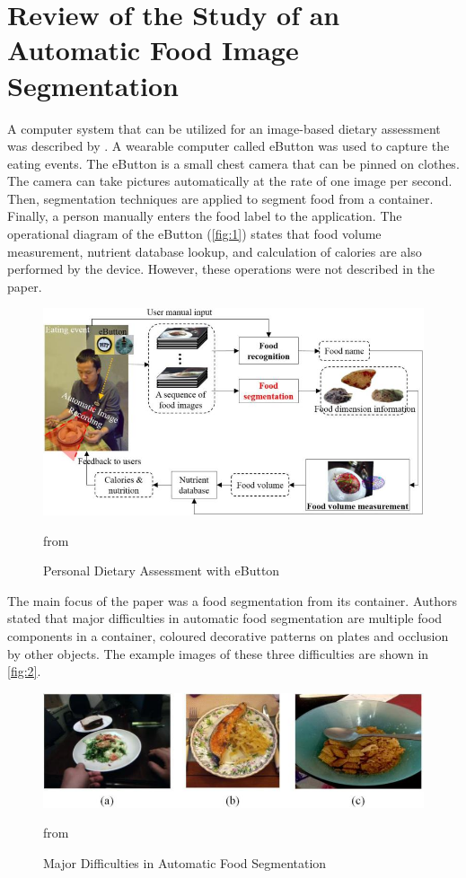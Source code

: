 \section{ Review of the  Study of an Automatic Food Image Segmentation }
A computer system that can be utilized for an image-based dietary assessment was described by \cite{chen2015saliency}. A wearable computer called eButton was used to capture the eating events. The eButton is a small chest camera that can be pinned on clothes. The camera can take pictures automatically at the rate of one image per second. Then, segmentation techniques are applied to segment food from a container. Finally, a person manually enters the food label to the application. The operational diagram of the eButton (\autoref{fig:1}) states that food volume measurement, nutrient database lookup, and calculation of calories are also performed by the device. However, these operations were not described in the paper. 

\begin{figure}[ht]
\centering
\includegraphics{Figures/segm_01.jpg}
\caption{Personal Dietary Assessment with eButton} from \citep{chen2015saliency} 
\label{fig:1}
\end{figure}

The main focus of the paper was a food segmentation from its container. Authors stated that major difficulties in automatic food segmentation are multiple food components in a container, coloured decorative patterns on plates and occlusion by other objects. The example images of these three difficulties are shown in \autoref{fig:2}.

\begin{figure}[ht]
\centering
\includegraphics{Figures/segm_02.jpg}
\caption{Major Difficulties in Automatic Food Segmentation} from \citep{chen2015saliency}
\label{fig:2}
\end{figure}


